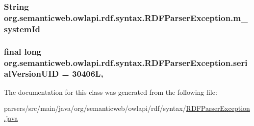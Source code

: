 \hypertarget{classorg_1_1semanticweb_1_1owlapi_1_1rdf_1_1syntax_1_1_r_d_f_parser_exception_a0e1ccbb7e9ee638afdacf521ac7d1866}{
\subsubsection[{m\-\_\-system\-Id}]{\setlength{\rightskip}{0pt plus 5cm}String org.\-semanticweb.\-owlapi.\-rdf.\-syntax.\-R\-D\-F\-Parser\-Exception.\-m\-\_\-system\-Id\hspace{0.3cm}{\ttfamily [protected]}}}\label{classorg_1_1semanticweb_1_1owlapi_1_1rdf_1_1syntax_1_1_r_d_f_parser_exception_a0e1ccbb7e9ee638afdacf521ac7d1866}
\hypertarget{classorg_1_1semanticweb_1_1owlapi_1_1rdf_1_1syntax_1_1_r_d_f_parser_exception_a61debbe652c755e4ddcf70e78db82dd2}{
\subsubsection[{serial\-Version\-U\-I\-D}]{\setlength{\rightskip}{0pt plus 5cm}final long org.\-semanticweb.\-owlapi.\-rdf.\-syntax.\-R\-D\-F\-Parser\-Exception.\-serial\-Version\-U\-I\-D = 30406\-L\hspace{0.3cm}{\ttfamily [static]}, {\ttfamily [private]}}}\label{classorg_1_1semanticweb_1_1owlapi_1_1rdf_1_1syntax_1_1_r_d_f_parser_exception_a61debbe652c755e4ddcf70e78db82dd2}


The documentation for this class was generated from the following file\-:\begin{DoxyCompactItemize}
\item 
parsers/src/main/java/org/semanticweb/owlapi/rdf/syntax/\hyperlink{_r_d_f_parser_exception_8java}{R\-D\-F\-Parser\-Exception.\-java}\end{DoxyCompactItemize}
